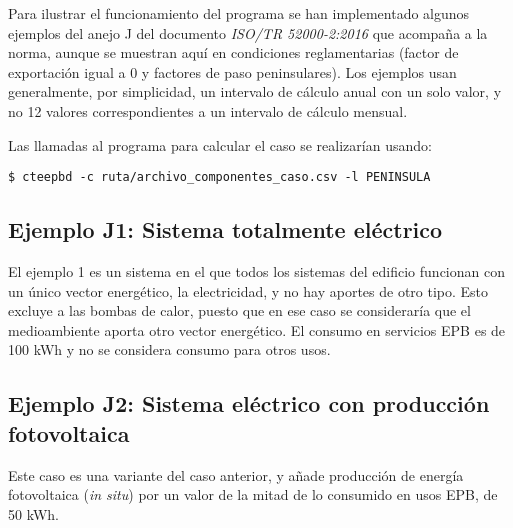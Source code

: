 \documentclass[10pt,notitlepage,oneside,a4paper]{article}
\begin{document}
Para ilustrar el funcionamiento del programa se han implementado algunos ejemplos del anejo J del documento \textit{ISO/TR 52000-2:2016} que acompaña a la norma, aunque se muestran aquí en condiciones reglamentarias (factor de exportación igual a 0 y factores de paso peninsulares). Los ejemplos usan generalmente, por simplicidad, un intervalo de cálculo anual con un solo valor, y no 12 valores correspondientes a un intervalo de cálculo mensual.

Las llamadas al programa para calcular el caso se realizarían usando:

\begin{Verbatim}[fontsize=\small]
    $ cteepbd -c ruta/archivo_componentes_caso.csv -l PENINSULA
\end{Verbatim}

\subsection{Ejemplo J1: Sistema totalmente eléctrico}
El ejemplo 1 es un sistema en el que todos los sistemas del edificio funcionan con un único vector energético, la electricidad, y no hay aportes de otro tipo. Esto excluye a las bombas de calor, puesto que en ese caso se consideraría que el medioambiente aporta otro vector energético. El consumo en servicios EPB es de 100 kWh y no se considera consumo para otros usos.






\subsection{Ejemplo J2: Sistema eléctrico con producción fotovoltaica}

Este caso es una variante del caso anterior, y añade producción de energía fotovoltaica (\textit{in situ}) por un valor de la mitad de lo consumido en usos EPB, de 50 kWh.




\end{document}
